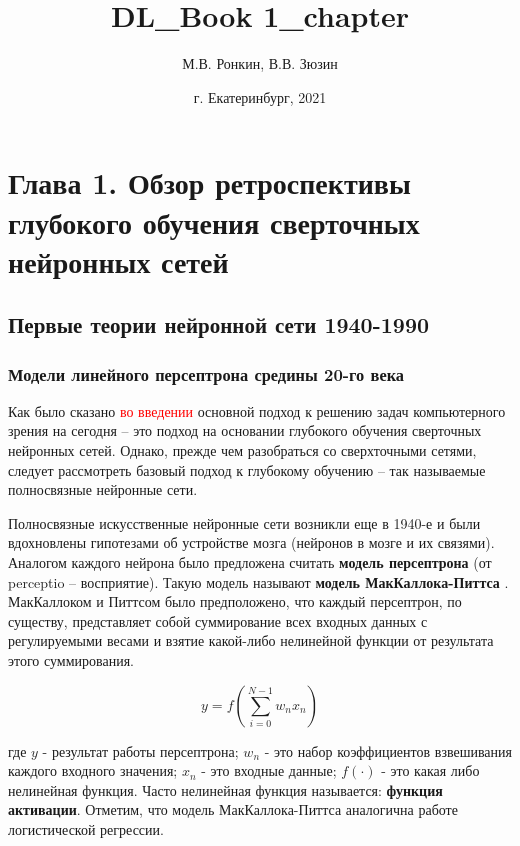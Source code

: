 \documentclass[12pt]{article}
\title{DL_Book 1_chapter}
\author{М.В. Ронкин, В.В. Зюзин }
\date{г. Екатеринбург, 2021}
\begin{document}
\begin{sloppypar}



\newpage
\section{Глава 1. Обзор ретроспективы глубокого обучения сверточных нейронных сетей}
\subsection{Первые теории нейронной сети 1940-1990}
\subsubsection{Модели линейного персептрона средины 20-го века}
Как было сказано \textcolor{red}{во введении} основной подход к решению задач компьютерного зрения на сегодня – это подход на основании глубокого обучения сверточных нейронных сетей. Однако, прежде чем разобраться со сверхточными сетями, следует рассмотреть базовый подход к глубокому обучению – так называемые полносвязные нейронные сети. 

Полносвязные искусственные нейронные сети возникли еще в 1940-е и были вдохновлены гипотезами об устройстве мозга (нейронов в мозге и их связями). Аналогом каждого нейрона было предложена считать \textbf{модель персептрона} (от perceptio – восприятие). Такую модель называют\textbf{ модель МакКаллока-Питтса} 
\cite{mcculloch1943logical}. 
МакКаллоком и Питтсом было предположено, что каждый персептрон, по существу, представляет собой суммирование всех входных данных с регулируемыми весами и взятие какой-либо нелинейной функции от результата этого суммирования. 

    \begin{equation}
    	y = f\left(\sum_{i=0}^{N-1}w_n x_n\right)
    \end{equation}

где $ y $ - результат работы персептрона; $w_n$ - это набор коэффициентов взвешивания каждого входного значения;  $x_n$ - это входные данные; $ f (\cdot )$ - это какая либо нелинейная функция. Часто нелинейная функция называется: \textbf{функция активации}. 
Отметим, что модель МакКаллока-Питтса аналогична работе логистической регрессии. 


\end{sloppypar}
\end{document}
